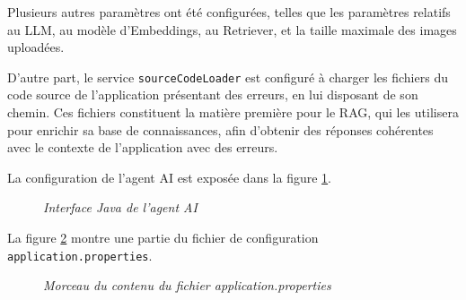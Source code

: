 \documentclass[12pt,a4paper]{report}
\begin{document}
	Plusieurs autres paramètres ont été configurées, telles que les paramètres relatifs au LLM, au modèle d'Embeddings, au Retriever, et la taille maximale des images uploadées.
	
	D'autre part, le service \verb|sourceCodeLoader| est configuré à charger les fichiers du code source de l'application présentant des erreurs, en lui disposant de son chemin. Ces fichiers constituent la matière première pour le RAG, qui les utilisera pour enrichir sa base de connaissances, afin d'obtenir des réponses cohérentes avec le contexte de l'application avec des erreurs.
	
	La configuration de l'agent AI est exposée dans la figure \ref{fig:ai-agent}.
	
		\begin{figure}[H]
		\centering
		\caption{\textit{Interface Java de l'agent AI}}
		\label{fig:ai-agent}
	\end{figure}
	
	La figure \ref{fig:properties} montre une partie du fichier de configuration \verb|application.properties|.
	
	\begin{figure}[H]
		\centering
		\caption{\textit{Morceau du contenu du fichier application.properties}}
		\label{fig:properties}
	\end{figure}
	
\end{document}
